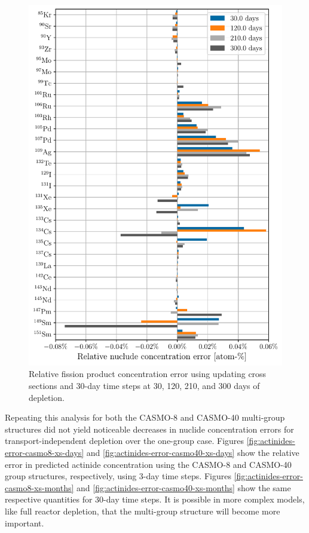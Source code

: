     \begin{figure}[htpb]
        \centering
        \includegraphics[width=\linewidth]{figs/fission_products_updating_xs_predictor_fission_q_months.pdf}
        \caption{Relative fission product concentration error using
        updating cross sections and 30-day time steps at 30, 120, 210, and 300
    days of depletion.}
        \label{fig:fp-error-updating-xs-months}
    \end{figure}

    Repeating this analysis for both the CASMO-8 and CASMO-40 multi-group
    structures did not yield noticeable decreases in nuclide concentration
    errors for transport-independent depletion over the one-group case.  Figures
    \ref{fig:actinides-error-casmo8-xs-days} and
    \ref{fig:actinides-error-casmo40-xs-days} show the relative error in
    predicted actinide concentration using the CASMO-8 and CASMO-40 group
    structures, respectively, using 3-day time steps. Figures
    \ref{fig:actinides-error-casmo8-xs-months} and
    \ref{fig:actinides-error-casmo40-xs-months} show the same respective
    quantities for 30-day time steps.  It is possible in more complex models,
    like full reactor depletion, that the multi-group structure will become more
    important. 

